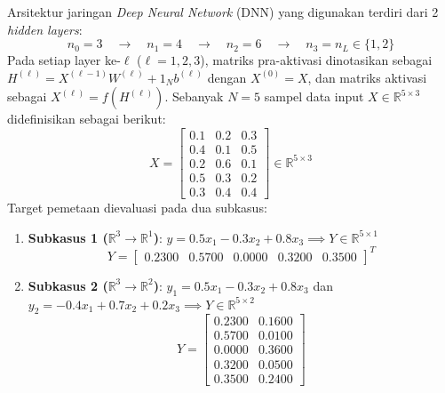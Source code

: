 \documentclass[11pt,a4paper]{article}
\def\mathbf#1{#1}%
\theoremstyle{plain}
\theoremstyle{definition}
\theoremstyle{remark}
\begin{document}
\noindent Arsitektur jaringan \textit{Deep Neural Network} (DNN) yang digunakan terdiri dari 2 \textit{hidden layers}:
\begin{equation}
    n_0 = 3 \quad \longrightarrow \quad n_1 = 4 \quad \longrightarrow \quad n_2 = 6 \quad \longrightarrow \quad n_3 = n_L \in \{1, 2\}
\end{equation}
Pada setiap layer ke-$\ell$ ($\ell = 1, 2, 3$), matriks pra-aktivasi dinotasikan sebagai $H^{(\ell)} = X^{(\ell-1)} W^{(\ell)} + \mathbf{1}_N \mathbf{b}^{(\ell)}$ dengan $X^{(0)} = X$, dan matriks aktivasi sebagai $X^{(\ell)} = f\!\left(H^{(\ell)}\right)$. Sebanyak $N = 5$ sampel data input $X \in \mathbb{R}^{5 \times 3}$ didefinisikan sebagai berikut:
\begin{equation}
    X = \begin{bmatrix}
        0.1 & 0.2 & 0.3 \\
        0.4 & 0.1 & 0.5 \\
        0.2 & 0.6 & 0.1 \\
        0.5 & 0.3 & 0.2 \\
        0.3 & 0.4 & 0.4
    \end{bmatrix} \in \mathbb{R}^{5 \times 3} \label{eq:matrix_X}
\end{equation}
Target pemetaan dievaluasi pada dua subkasus:
\begin{enumerate}
    \item \textbf{Subkasus 1 ($\mathbb{R}^3 \to \mathbb{R}^1$)}: $y = 0.5x_1 - 0.3x_2 + 0.8x_3 \implies Y \in \mathbb{R}^{5 \times 1}$
    \begin{equation}
        Y = \begin{bmatrix} 0.2300 & 0.5700 & 0.0000 & 0.3200 & 0.3500 \end{bmatrix}^T \label{eq:target_r1}
    \end{equation}
    \item \textbf{Subkasus 2 ($\mathbb{R}^3 \to \mathbb{R}^2$)}: $y_1 = 0.5x_1 - 0.3x_2 + 0.8x_3$ dan $y_2 = -0.4x_1 + 0.7x_2 + 0.2x_3 \implies Y \in \mathbb{R}^{5 \times 2}$
    \begin{equation}
        Y = \begin{bmatrix}
            0.2300 & 0.1600 \\
            0.5700 & 0.0100 \\
            0.0000 & 0.3600 \\
            0.3200 & 0.0500 \\
            0.3500 & 0.2400
        \end{bmatrix} \label{eq:target_r2}
    \end{equation}
\end{enumerate}
\end{document}
